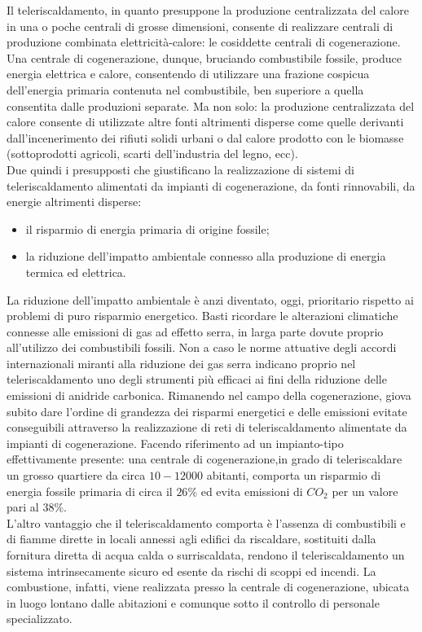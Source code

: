 \documentclass[laurea,oneside,11pt]{USiena_tesiLM}
\begin{document}
Il teleriscaldamento, in quanto presuppone la produzione centralizzata del calore in una o poche centrali di grosse dimensioni, consente di realizzare centrali di produzione combinata elettricità-calore: le cosiddette  centrali di cogenerazione.
Una centrale di cogenerazione, dunque, bruciando combustibile fossile, produce energia elettrica e calore, consentendo di utilizzare una frazione cospicua dell'energia primaria contenuta nel combustibile, ben superiore a quella consentita dalle produzioni separate.
Ma non solo: la produzione centralizzata del calore consente di utilizzate altre fonti altrimenti disperse come quelle derivanti dall'incenerimento dei rifiuti solidi urbani o dal calore prodotto con le biomasse (sottoprodotti agricoli, scarti dell'industria del legno, ecc).\\

Due quindi i presupposti che giustificano la realizzazione di sistemi di teleriscaldamento alimentati da impianti di cogenerazione, da fonti rinnovabili, da energie altrimenti disperse:
\begin{itemize}
\item il risparmio di energia primaria di origine fossile;
\item la riduzione dell'impatto ambientale connesso alla produzione di energia termica ed elettrica.
\end{itemize}
La riduzione dell'impatto ambientale è anzi diventato, oggi, prioritario rispetto ai problemi di puro risparmio energetico. Basti ricordare le alterazioni climatiche connesse alle emissioni di gas ad effetto serra, in larga parte dovute proprio all'utilizzo dei combustibili fossili. Non a caso le norme attuative degli accordi internazionali miranti alla riduzione dei gas serra indicano proprio nel teleriscaldamento uno degli strumenti più efficaci ai fini della riduzione delle emissioni di anidride carbonica.
Rimanendo nel campo della cogenerazione, giova subito dare l'ordine di grandezza dei risparmi energetici e delle emissioni evitate conseguibili attraverso la realizzazione di reti di teleriscaldamento alimentate da impianti di cogenerazione.
Facendo riferimento ad un impianto-tipo effettivamente presente: una centrale di cogenerazione,in grado di teleriscaldare un grosso quartiere da circa $10-12000$ abitanti, comporta un risparmio di energia fossile primaria di circa il $26\%$ ed evita emissioni di $CO_2$ per un valore pari al $38\%$.\\

L'altro vantaggio che il teleriscaldamento comporta è l'assenza di combustibili e di fiamme dirette in locali annessi agli edifici da riscaldare, sostituiti dalla fornitura diretta di acqua calda o surriscaldata, rendono il teleriscaldamento un sistema intrinsecamente sicuro ed esente da rischi di scoppi ed incendi.
La combustione, infatti, viene realizzata presso la centrale di cogenerazione, ubicata in luogo lontano dalle abitazioni e comunque sotto il controllo di personale specializzato.
\end{document}

